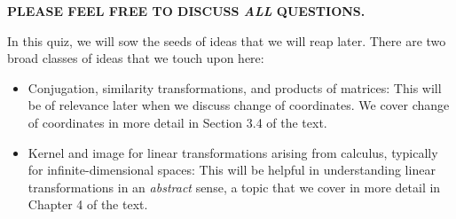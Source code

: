 \documentclass[10pt]{amsart}
\begin{document}
{\bf PLEASE FEEL FREE TO DISCUSS {\em ALL} QUESTIONS.}

In this quiz, we will sow the seeds of ideas that we will reap
later. There are two broad classes of ideas that we touch upon here:

\begin{itemize}
\item Conjugation, similarity transformations, and products of
  matrices: This will be of relevance later when we discuss change of
  coordinates. We cover change of coordinates in more detail in
  Section 3.4 of the text.
\item Kernel and image for linear transformations arising from
  calculus, typically for infinite-dimensional spaces: This will be
  helpful in understanding linear transformations in an {\em abstract}
  sense, a topic that we cover in more detail in Chapter 4 of the text.
\end{itemize}
\end{document}
